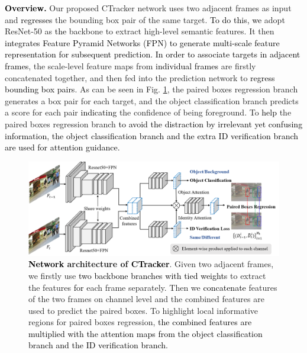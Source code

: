 \documentclass[../arXiv_main.tex]{subfiles}
\newcommand\pjl[1]{\textcolor{black}{#1}}
\newcommand\wfb[1]{\textcolor{black}{#1}}
\newcommand\CRwfb[1]{\textcolor{black}{#1}}
\newcommand{\CRyang}[1]{\textcolor{black}{#1}}
\begin{document}
\noindent \noindent\textbf{\wfb{Overview.}} Our proposed CTracker network uses two adjacent frames as input and \wfb{regresses} the bounding box pair of the same target. \CRyang{To do this, we} adopt ResNet-50 \cite{he2016deep} as \wfb{the} backbone to extract high-level semantic features. It then \wfb{integrates Feature Pyramid Networks (FPN) to generate multi-scale feature representation for subsequent prediction.} \wfb{In order to associate targets in adjacent frames}, the scale-level feature maps from \CRyang{individual frames} are firstly concatenated together, and then fed into the prediction network to \CRyang{regress bounding box pairs}. As can be seen in Fig. \ref{fig:model}, the paired boxes regression branch generates a box pair for each target, and the object classification branch predicts a score for each pair \CRwfb{indicating} the confidence of being foreground. To \CRwfb{help} the paired boxes regression branch \CRwfb{to} \CRyang{avoid the distraction by irrelevant yet confusing information, \wfb{the} object classification branch and the extra ID verification branch are used for attention guidance.}


\begin{figure}[t]
\centering{}\includegraphics[width=0.95\columnwidth]{figure/model_final.png}
\caption{\label{fig:model}\textbf{\CRyang{Network} architecture of \CRyang{CTracker}}. Given two adjacent frames, we firstly use \pjl{two backbone branches with tied weights} to extract the features \CRyang{for} each frame separately. Then we \CRwfb{concatenate} features of the two frames on channel level and the combined features are used to predict the paired boxes. To highlight local informative regions for paired boxes regression, \CRyang{the combined features are multiplied with the attention maps from the object classification branch and the ID verification branch.}}
\end{figure}
\end{document}
